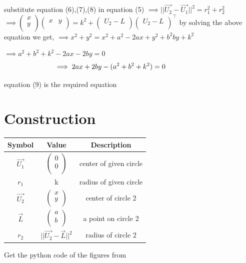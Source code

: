 \documentclass[journal,12pt,twocolumn]{IEEEtran}
\begin{document}
substitute equation (6),(7),(8) in equation (5)
$\implies ||{\vec{U_2} - \vec{U_1}}||^2 = r_1^2 + r_2^2$
\hspace{1cm}$\implies \begin{pmatrix}x \\ y \\ \end{pmatrix} \begin{pmatrix}x & y \\ \end{pmatrix}=k^2+
\begin{pmatrix}U_2-L \\ \end{pmatrix} \begin{pmatrix}U_2-L \\ \end{pmatrix}^{\top}$
\unboldmath
by solving the above equation we get,
\boldmath
$\implies x^2+y^2 = x^2+a^2-2ax+y^2+b^2by+k^2$

$\implies a^2+b^2+k^2-2ax-2by=0$
\begin{align}
\hspace{-2cm}\implies 2ax+2by-(a^2+b^2+k^2)=0
\end{align}
\unboldmath 

equation (9) is the required equation
\section*{Construction}
\centering
\vspace{0.2cm}
{
\setlength\extrarowheight{2pt}
\begin{tabular}{|c|c|c|}
	\hline
	\textbf{Symbol}&\textbf{Value}&\textbf{Description}\\
	\hline
	$\vec{U_1}$ & $\begin{pmatrix}0 \\ 0 \\ \end{pmatrix}$ & center of given circle\\
	\hline
	$r_1$ & k & radius of given circle\\
	\hline
	$\vec{U_2}$ & $\begin{pmatrix}x \\ y \\ \end{pmatrix}$ & center of circle 2\\
	\hline
	$\vec{L}$ & $\begin{pmatrix}a \\ b \\ \end{pmatrix}$ & a point on  circle 2\\
	\hline
	$r_2$ & $||{\vec{U_2}-\vec{L}}||^2$ & radius of circle 2\\
	\hline
\end{tabular}
}

\vspace{0.6cm}
Get the python code of the figures from
\begin{table}[h]
\large
\centering
{}


\end{table}
\end{document}
